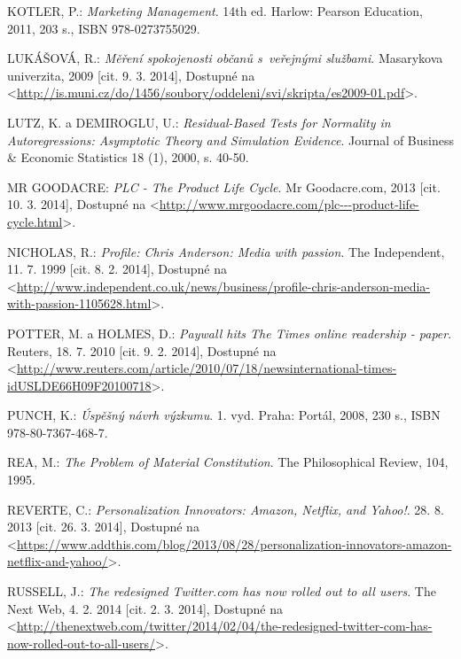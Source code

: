 \documentclass[12pt,oneside,openany]{fithesis}
\begin{document}
\begin{thebibliography}{99}
KOTLER, P.: \emph{Marketing Management}. 14th ed. Harlow: Pearson Education, 2011, 203 s., ISBN 978-0273755029.

LUKÁŠOVÁ, R.: \emph{Měření spokojenosti občanů s~veřejnými službami}. Masarykova univerzita, 2009 [cit. 9. 3. 2014], Dostupné na {\textless}\url{http://is.muni.cz/do/1456/soubory/oddeleni/svi/skripta/es2009-01.pdf}{\textgreater}.

LUTZ, K. a DEMIROGLU, U.: \emph{Residual-Based Tests for Normality in Autoregressions: Asymptotic
      Theory and Simulation Evidence}. Journal of Business \& Economic Statistics 18
        (1), 2000, s. 40-50.

MR GOODACRE: \emph{PLC - The Product Life Cycle}. Mr Goodacre.com, 2013 [cit. 10. 3. 2014], Dostupné na {\textless}\url{http://www.mrgoodacre.com/plc---product-life-cycle.html}{\textgreater}.

NICHOLAS, R.: \emph{Profile: Chris Anderson: Media with passion}. The Independent, 11. 7. 1999 [cit. 8. 2. 2014], Dostupné na {\textless}\url{http://www.independent.co.uk/news/business/profile-chris-anderson-media-with-passion-1105628.html}{\textgreater}.

POTTER, M. a HOLMES, D.: \emph{Paywall hits The Times online readership - paper}. Reuters, 18. 7. 2010 [cit. 9. 2. 2014], Dostupné na {\textless}\url{http://www.reuters.com/article/2010/07/18/newsinternational-times-idUSLDE66H09F20100718}{\textgreater}.

PUNCH, K.: \emph{Úspěšný návrh výzkumu}. 1. vyd. Praha: Portál, 2008, 230 s., ISBN 978-80-7367-468-7.

REA, M.: \emph{The Problem of Material Constitution}. The Philosophical Review, 104, 1995.

REVERTE, C.: \emph{Personalization Innovators: Amazon, Netflix, and Yahoo!}. 28. 8. 2013 [cit. 26. 3. 2014], Dostupné na {\textless}\url{https://www.addthis.com/blog/2013/08/28/personalization-innovators-amazon-netflix-and-yahoo/}{\textgreater}.

RUSSELL, J.: \emph{The redesigned Twitter.com has now rolled out to all users}.
The Next Web, 4. 2. 2014 [cit. 2. 3. 2014], Dostupné na {\textless}\url{http://thenextweb.com/twitter/2014/02/04/the-redesigned-twitter-com-has-now-rolled-out-to-all-users/}{\textgreater}.


\end{thebibliography}
\end{document}

